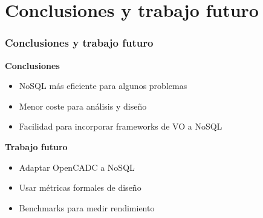 \documentclass[serif,12pt]{beamer}
\begin{document}
\section{Conclusiones y trabajo futuro}
\begin{frame}
\frametitle{Conclusiones y trabajo futuro}

\begin{multicols}{2}

\textbf{Conclusiones}
\begin{itemize}
\item NoSQL más eficiente para algunos problemas
\item Menor coste para análisis y diseño
\item Facilidad para incorporar frameworks de VO a NoSQL
\end{itemize}

\textbf{Trabajo futuro}
\begin{itemize}
\item Adaptar OpenCADC a NoSQL
\item Usar métricas formales de diseño
\item Benchmarks para medir rendimiento
\end{itemize}

\end{multicols}

\end{frame}
\end{document}
